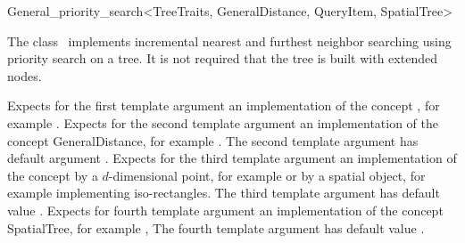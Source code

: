 

\begin{ccRefClass}{General_priority_search<TreeTraits, GeneralDistance, QueryItem, SpatialTree>}  %


\ccDefinition

The class \ccRefName\ implements incremental nearest and furthest neighbor searching
using priority search on a tree. It is not required that the tree is
built with extended nodes.


\ccParameters

Expects for the first template argument an implementation of the concept ,
for example .
Expects for the second template argument an implementation of the
concept GeneralDistance, for example .
The second template argument has default argument 
.
Expects for the third template argument an implementation of the concept
by a $d$-dimensional point, for example 
or by a spatial object, for
example  implementing iso-rectangles.
The third template argument has default value .
Expects for fourth template argument an implementation of the concept SpatialTree,
for example ,
The fourth template argument has default value .


\ccTypes



\end{ccRefClass}
